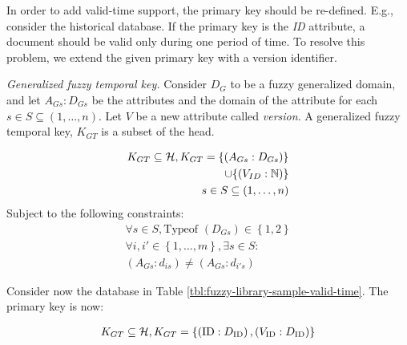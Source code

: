 In order to add valid-time support, the primary key should be re-defined. E.g., consider the historical database. If the primary key is the \emph{ID} attribute, a document should be valid only during one period of time. To resolve this problem, we extend the given primary key with a version identifier. 




\begin{definition}
\label{def:generalized-fuzzy-temporal-key}
\emph{Generalized fuzzy temporal key.}
Consider $D_G$ to be a fuzzy generalized domain, and let $A_{Gs}:D_{Gs}$ be the attributes and the domain of the attribute for each $s \in S \subseteq \left(1, \ldots, n \right)$. Let  $V$ be a new attribute called \emph{version}. 
A generalized fuzzy temporal key, $K_{GT}$ is a subset of the head.


\begin{align}
\label{eq:generalized-fuzzy-temporal-key}
K_{GT} \subseteq \mathcal{H}, K_{GT} = \left \lbrace \left(A_{Gs}:D_{Gs} \right)  \right \rbrace \\
\nonumber
\cup  \{\left(V_{ID}:\mathbb{N}  \right)\}\\
\nonumber
s\in S \subseteq \left(1, \ldots, n \right)
\end{align}
Subject to the following constraints:
\begin{align}
\forall s \in S, \text{Typeof } \left(D_{Gs} \right) \in \left \lbrace 1, 2 \right \rbrace \\
\nonumber
\forall i, i' \in \left \lbrace 1, \ldots, m \right \rbrace , \exists s \in S: \\
\nonumber
\left(A_{Gs}:d_{is} \right) \neq \left(A_{Gs}:d_{i's} \right)
\end{align}
\end{definition}

Consider now the database in Table \ref{tbl:fuzzy-library-sample-valid-time}. The primary key is now:

\begin{align}
 \nonumber
K_{GT} \subseteq \mathcal{H}, K_{GT} = \left \lbrace  \left(\text{ID}:D_{\text{ID}} \right) , \left(V_{\text{ID}}:D_{\text{ID}} \right) \right \rbrace	
\end{align}

